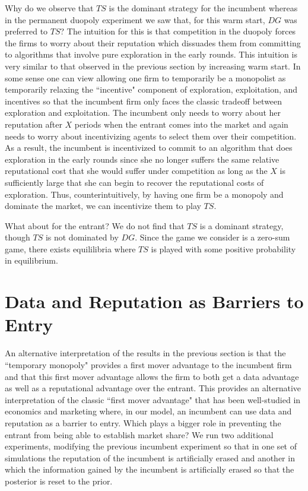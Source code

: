 \documentclass{article}
\theoremstyle{definition}
\begin{document}
Why do we observe that $TS$ is the dominant strategy for the incumbent whereas in the permanent duopoly experiment we saw that, for this warm start, $DG$ was preferred to $TS$? The intuition for this is that competition in the duopoly forces the firms to worry about their reputation which dissuades them from committing to algorithms that involve pure exploration in the early rounds. This intuition is very similar to that observed in the previous section by increasing warm start. In some sense one can view allowing one firm to temporarily be a monopolist as temporarily relaxing the ``incentive" component of exploration, exploitation, and incentives so that the incumbent firm only faces the classic tradeoff between exploration and exploitation. The incumbent only needs to worry about her reputation after $X$ periods when the entrant comes into the market and again needs to worry about incentivizing agents to select them over their competition. As a result, the incumbent is incentivized to commit to an algorithm that does exploration in the early rounds since she no longer suffers the same relative reputational cost that she would suffer under competition as long as the $X$ is sufficiently large that she can begin to recover the reputational costs of exploration. Thus, counterintuitively, by having one firm be a monopoly and dominate the market, we can incentivize them to play $TS$.

What about for the entrant? We do not find that $TS$ is a dominant strategy, though $TS$ is not dominated by $DG$. Since the game we consider is a zero-sum game, there exists equililibria where $TS$ is played with some positive probability in equilibrium.

\section{Data and Reputation as Barriers to Entry}

An alternative interpretation of the results in the previous section is that the ``temporary monopoly" provides a first mover advantage to the incumbent firm and that this first mover advantage allows the firm to both get a data advantage as well as a reputational advantage over the entrant. This provides an alternative interpretation of the classic ``first mover advantage" that has been well-studied in economics and marketing \citep*{kerin1992first} where, in our model, an incumbent can use data and reputation as a barrier to entry. Which plays a bigger role in preventing the entrant from being able to establish market share? We run two additional experiments, modifying the previous incumbent experiment so that in one set of simulations the reputation of the incumbent is artificially erased and another in which the information gained by the incumbent is artificially erased so that the posterior is reset to the prior.
\end{document}

